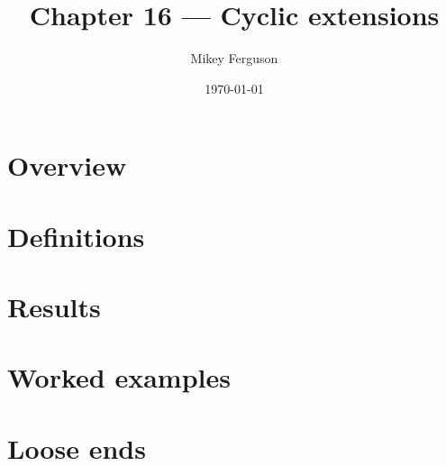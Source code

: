 \documentclass[11pt]{article}
\title{Chapter 16 --- Cyclic extensions}
\author{Mikey Ferguson}
\date{\today}
\begin{document}
\maketitle
\tableofcontents
\bigskip

\section{Overview}

\section{Definitions}

\section{Results}

\section{Worked examples}

\section{Loose ends}
\end{document}
